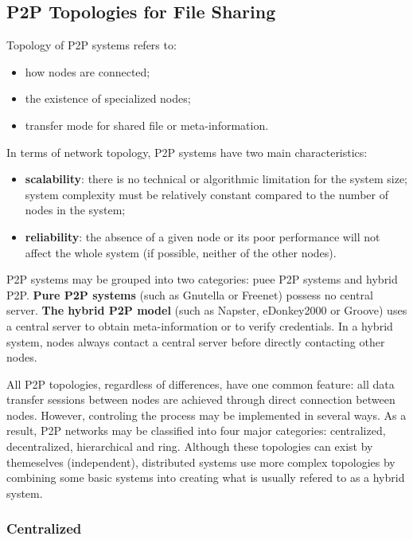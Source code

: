 \subsection{P2P Topologies for File Sharing}

Topology of P2P systems refers to:
\begin{itemize}
  \item how nodes are connected;
  \item the existence of specialized nodes;
  \item transfer mode for shared file or meta-information.
\end{itemize}

In terms of network topology, P2P systems have two main characteristics:

\begin{itemize}
  \item \textbf{scalability}: there is no technical or algorithmic limitation
  for the system size; system complexity must be relatively constant compared
  to the number of nodes in the system;
  \item \textbf{reliability}: the absence of a given node or its poor
  performance will not affect the whole system (if possible, neither of the
  other nodes).
\end{itemize}

P2P systems may be grouped into two categories: puee P2P systems and hybrid
P2P. \textbf{Pure P2P systems} (such as Gnutella or Freenet) possess no
central server. \textbf{The hybrid P2P model} (such as Napster, eDonkey2000 or
Groove) uses a central server to obtain meta-information or to verify
credentials. In a hybrid system, nodes always contact a central server before
directly contacting other nodes.

All P2P topologies, regardless of differences, have one common feature: all
data transfer sessions between nodes are achieved through direct connection
between nodes. However, controling the process may be implemented in several
ways. As a result, P2P networks may be classified into four major categories:
centralized, decentralized, hierarchical and ring. Although these topologies
can exist by themeselves (independent), distributed systems use more complex
topologies by combining some basic systems into creating what is usually
refered to as a hybrid system.

\subsubsection{Centralized}

